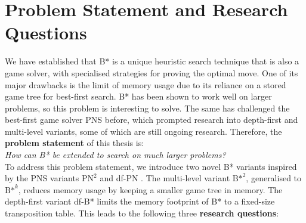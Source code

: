 \section{Problem Statement and Research Questions}
\label{sec:problemStatementAndRQs}
We have established that B* is a unique heuristic search technique that is also a game solver, with specialised strategies for proving the optimal move. One of its major drawbacks is the limit of memory usage due to its reliance on a stored game tree for best-first search. B* has been shown to work well on larger problems, so this problem is interesting to solve. The same has challenged the best-first game solver PNS before, which prompted research into depth-first and multi-level variants, some of which are still ongoing research.
Therefore, the \textbf{problem statement} of this thesis is:
\\[1\baselineskip]
\textit{How can B* be extended to search on much larger problems?}
\\[1\baselineskip]
To address this problem statement, we introduce two novel B* variants inspired by the PNS variants ${\text{PN}}^2$ \cite{Breuker1998} and df-PN \cite{Nagai2002}. The multi-level variant ${\text{B*}}^2$, generalised to ${\text{B*}}^k$, reduces memory usage by keeping a smaller game tree in memory. The depth-first variant df-B* limits the memory footprint of B* to a fixed-size transposition table.
This leads to the following three \textbf{research questions}:
